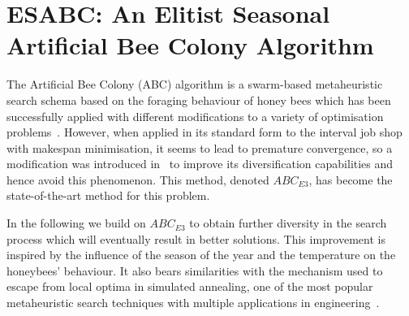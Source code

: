 \documentclass[icae]{iosart2x}
\begin{document}
\section{ESABC: An Elitist Seasonal Artificial Bee Colony Algorithm}\label{secABC}

The Artificial Bee Colony (ABC) algorithm is a swarm-based metaheuristic search schema based on the foraging behaviour of honey bees which has been successfully applied with different modifications to a variety of optimisation problems~\cite{Karaboga2014}. However, when applied in its standard form to the interval job shop with makespan minimisation, it seems to lead to premature convergence, so a modification was introduced in~\cite{Diaz2022} to improve its diversification capabilities and hence avoid this phenomenon. This method, denoted $ABC_{E3}$, has become the state-of-the-art method for this problem.

In the following we build on \textsf{$ABC_{E3}$} to obtain further diversity in the search process which will eventually result in better solutions. This improvement is inspired by the influence of the season of the year and the temperature on the honeybees' behaviour. It also bears similarities with the mechanism used to escape from local optima in simulated annealing, one of the most popular metaheuristic search techniques with multiple applications in engineering~\cite{Siddique2016b}.
\end{document}
